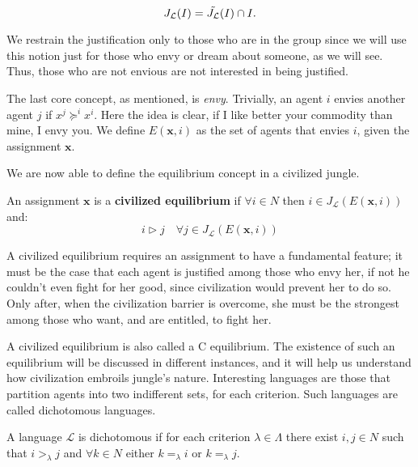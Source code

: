 \begin{equation}\label{eqn: J_L}
    J_{\mathcal{L}}(I)=\Tilde{J_{\mathcal{L}}}(I)\cap I.
\end{equation}

We restrain the justification only to those who are in the group since we will use this notion just for those who envy or dream about someone, as we will see. Thus, those who are not envious are not interested in being justified. 

The last core concept, as mentioned, is \textit{envy}. Trivially, an agent $i$ envies another agent $j$ if $x^j\succeq^ix^i$. Here the idea is clear, if I like better your commodity than mine, I envy you. We define $E(\textbf{x},i)$ as the set of agents that envies $i$, given the assignment $\textbf{x}$. 

We are now able to define the equilibrium concept in a civilized jungle.

\begin{definition}
    An assignment $\textbf{x}$ is a \textbf{civilized equilibrium} if $\forall i\in N$ then $i\in J_{\mathcal{L}}(E(\textbf{x},i))$ and:
    \[i\triangleright j \quad \forall j\in J_{\mathcal{L}}(E(\textbf{x},i)) \]
\end{definition}

A civilized equilibrium requires an assignment to have a fundamental feature; it must be the case that each agent is justified among those who envy her, if not he couldn't even fight for her good, since civilization would prevent her to do so. Only after, when the civilization barrier is overcome, she must be the strongest among those who want, and are entitled, to fight her.  

A civilized equilibrium is also called a C equilibrium. The existence of such an equilibrium will be discussed in different instances, and it will help us understand how civilization embroils jungle's nature. Interesting languages are those that partition agents into two indifferent sets, for each criterion. Such languages are called dichotomous languages.

\begin{definition}\label{def: dichotomous language}
    A language $\mathcal{L}$ is dichotomous if for each criterion $\lambda\in\Lambda$ there exist $i,j\in N$ such that $i>_{\lambda}j$ and $\forall k\in N$ either $k=_{\lambda}i$ or $k=_{\lambda}j$.
\end{definition}

